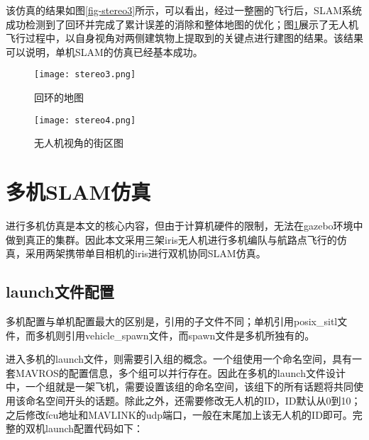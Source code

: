 该仿真的结果如图\ref{fig-stereo3}所示，可以看出，经过一整圈的飞行后，SLAM系统成功检测到了回环并完成了累计误差的消除和整体地图的优化；图\ref{fig-stereo4}展示了无人机飞行过程中，以自身视角对两侧建筑物上提取到的关键点进行建图的结果。该结果可以说明，单机SLAM的仿真已经基本成功。

\begin{figure}[htbp]
	\centering
	\begin{minipage}[t]{0.45\columnwidth}
		\centering
		\texttt{[image: stereo3.png]}
		\caption{回环的地图}
		\label{fig-stereo3}
	\end{minipage}
	\begin{minipage}[t]{0.45\columnwidth}
		\centering
		\texttt{[image: stereo4.png]}
		\caption{无人机视角的街区图}
		\label{fig-stereo4}
	\end{minipage}
\end{figure}


\section{多机SLAM仿真}

进行多机仿真是本文的核心内容，但由于计算机硬件的限制，无法在gazebo环境中做到真正的集群。因此本文采用三架iris无人机进行多机编队与航路点飞行的仿真，采用两架携带单目相机的iris进行双机协同SLAM仿真。

\subsection{launch文件配置} \label{4.3.1}

多机配置与单机配置最大的区别是，引用的子文件不同；单机引用posix\_sitl文件，而多机则引用vehicle\_spawn文件，而spawn文件是多机所独有的。

进入多机的launch文件，则需要引入组的概念。一个组使用一个命名空间，具有一套MAVROS的配置信息，多个组可以并行存在。因此在多机的launch文件设计中，一个组就是一架飞机，需要设置该组的命名空间，该组下的所有话题将共同使用该命名空间开头的话题。除此之外，还需要修改无人机的ID，ID默认从0到10；之后修改fcu地址和MAVLINK的udp端口，一般在末尾加上该无人机的ID即可。完整的双机launch配置代码如下：

